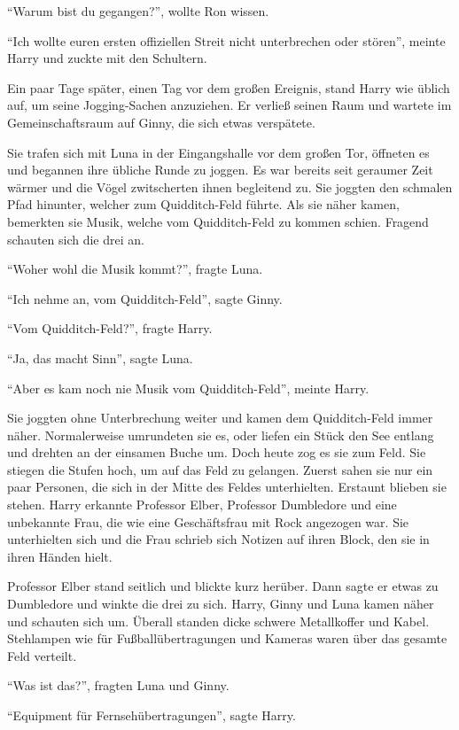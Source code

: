 \enquote{Warum bist du gegangen?}, wollte Ron wissen.

\enquote{Ich wollte euren ersten offiziellen Streit nicht unterbrechen oder stören}, meinte Harry und zuckte mit den Schultern.

Ein paar Tage später, einen Tag vor dem großen Ereignis, stand Harry wie üblich auf, um seine Jogging-Sachen anzuziehen. Er verließ seinen Raum und wartete im Gemeinschaftsraum auf Ginny, die sich etwas verspätete.

Sie trafen sich mit Luna in der Eingangshalle vor dem großen Tor, öffneten es und begannen ihre übliche Runde zu joggen. Es war bereits seit geraumer Zeit wärmer und die Vögel zwitscherten ihnen begleitend zu. Sie joggten den schmalen Pfad hinunter, welcher zum Quidditch-Feld führte. Als sie näher kamen, bemerkten sie Musik, welche vom Quidditch-Feld zu kommen schien. Fragend schauten sich die drei an.

\enquote{Woher wohl die Musik kommt?}, fragte Luna.

\enquote{Ich nehme an, vom Quidditch-Feld}, sagte Ginny.

\enquote{Vom Quidditch-Feld?}, fragte Harry.

\enquote{Ja, das macht Sinn}, sagte Luna.

\enquote{Aber es kam noch nie Musik vom Quidditch-Feld}, meinte Harry.

Sie joggten ohne Unterbrechung weiter und kamen dem Quidditch-Feld immer näher. Normalerweise umrundeten sie es, oder liefen ein Stück den See entlang und drehten an der einsamen Buche um. Doch heute zog es sie zum Feld. Sie stiegen die Stufen hoch, um auf das Feld zu gelangen. Zuerst sahen sie nur ein paar Personen, die sich in der Mitte des Feldes unterhielten. Erstaunt blieben sie stehen. Harry erkannte Professor Elber, Professor Dumbledore und eine unbekannte Frau, die wie eine Geschäftsfrau mit Rock angezogen war. Sie unterhielten sich und die Frau schrieb sich Notizen auf ihren Block, den sie in ihren Händen hielt.

Professor Elber stand seitlich und blickte kurz herüber. Dann sagte er etwas zu Dumbledore und winkte die drei zu sich. Harry, Ginny und Luna kamen näher und schauten sich um. Überall standen dicke schwere Metallkoffer und Kabel. Stehlampen wie für Fußballübertragungen und Kameras waren über das gesamte Feld verteilt.

\enquote{Was ist das?}, fragten Luna und Ginny.

\enquote{Equipment für Fernsehübertragungen}, sagte Harry.


